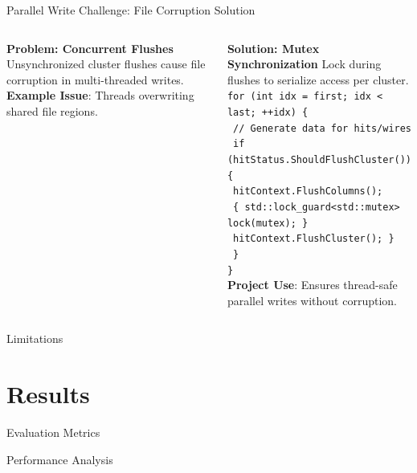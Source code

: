 \documentclass[aspectratio=169]{beamer}
\begin{document}
\begin{frame}{Parallel Write Challenge: File Corruption Solution}
  \begin{columns}
    \textbf{Problem: Concurrent Flushes}
    \small Unsynchronized cluster flushes cause file corruption in multi-threaded writes.
    \vspace{0.5em}
    \textbf{Example Issue}: Threads overwriting shared file regions.

    \textbf{Solution: Mutex Synchronization}
    \small Lock during flushes to serialize access per cluster.
    \vspace{0.5em}
    \texttt{for (int idx = first; idx < last; ++idx) \{} \\
    \texttt{  // Generate data for hits/wires} \\
    \texttt{  if (hitStatus.ShouldFlushCluster()) \{} \\
    \texttt{    hitContext.FlushColumns();} \\
    \texttt{    \{ std::lock\_guard<std::mutex> lock(mutex); \} } \\
    \texttt{    hitContext.FlushCluster(); \} } \\
    \texttt{  \} } \\
    \texttt{\}} \\
    \vspace{0.5em}
    \textbf{Project Use}: Ensures thread-safe parallel writes without corruption.
  \end{columns}
\end{frame}

\begin{frame}{Limitations}
\end{frame}

\section{Results}

\begin{frame}{Evaluation Metrics}
\end{frame}

\begin{frame}{Performance Analysis}
\end{frame}
\end{document}
